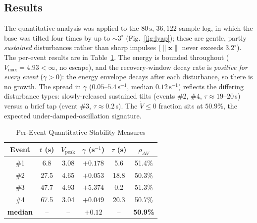 \documentclass[conference]{IEEEtran}
\begin{document}
\subsection{Results}
The quantitative analysis was applied to the $80\,\text{s}$, $36{,}122$-sample
log, in which the base was tilted four times by up to $\sim$$3^\circ$
      (Fig.~\ref{fig:lyap}); these are gentle, partly \emph{sustained} disturbances
      rather than sharp impulses ($\lVert\mathbf x\rVert$ never exceeds $3.2^\circ$).
      The per-event results are in Table~\ref{tab:lyap}. The energy is bounded
      throughout ($V_{\max}=4.93<\infty$, no escape), and the recovery-window decay
      rate is \emph{positive for every event} ($\gamma>0$): the energy envelope decays
      after each disturbance, so there is no growth. The spread in $\gamma$
      ($0.05$--$5.4\,\text{s}^{-1}$, median $0.12\,\text{s}^{-1}$) reflects the
      differing disturbance types: slowly-released sustained tilts (events \#2, \#4,
    $\tau\!\approx\!19$--$20\,$s) versus a brief tap (event \#3, $\tau\!\approx\!0.2\,$s).
      The $\dot V\le0$ fraction sits at $50.9\%$, the expected under-damped-oscillation
      signature.

      \begin{table}[t]
        \caption{Per-Event Quantitative Stability Measures}
        \label{tab:lyap}
        \centering
        \small
        \begin{tabular}{cccccc}
          \toprule
          Event           & $t$ (s) & $V_\text{peak}$ & $\gamma$ (s$^{-1}$) & $\tau$ (s) & $\rho_{\Delta V}$ \\
          \midrule
          \#1             & 6.8     & 3.08            & $+0.178$            & 5.6        & 51.4\%            \\
          \#2             & 27.5    & 4.65            & $+0.053$            & 18.8       & 50.3\%            \\
          \#3             & 47.7    & 4.93            & $+5.374$            & 0.2        & 51.3\%            \\
          \#4             & 67.5    & 3.04            & $+0.049$            & 20.3       & 50.7\%            \\
          \midrule
          \textbf{median} & --      & --              & $\mathbf{+0.12}$    & --         & \textbf{50.9\%}   \\
          \bottomrule
        \end{tabular}
      \end{table}
\end{document}
